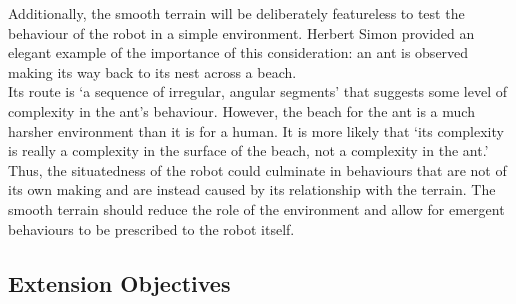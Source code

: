 \documentclass{article}
\begin{document}
Additionally, the smooth terrain will be deliberately featureless to test the behaviour of the robot in a simple environment. Herbert Simon provided an elegant example of the importance of this consideration: an ant is observed making its way back to its nest across a beach.\\
Its route is ‘a sequence of irregular, angular segments’ that suggests some level of complexity in the ant's behaviour. However, the beach for the ant is a much harsher environment than it is for a human. It is more likely that ‘its complexity is really a complexity in the surface of the beach, not a complexity in the ant.’  Thus, the situatedness of the robot could culminate in behaviours that are not of its own making and are instead caused by its relationship with the terrain. The smooth terrain should reduce the role of the environment and allow for emergent behaviours to be prescribed to the robot itself.\\

\subsection{Extension Objectives}
\end{document}
